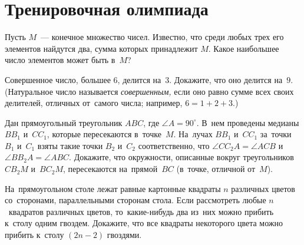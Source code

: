 
\section*{Тренировочная олимпиада}


\begin{problems}

\item
Пусть $M$~— конечное множество чисел.
Известно, что среди любых трех его элементов найдутся два, сумма которых
принадлежит $M$.
Какое наибольшее число элементов может быть в~$M$?

\item
Совершенное число, большее $6$, делится на~$3$.
Докажите, что оно делится на~$9$.
(Натуральное число называется \emph{совершенным,} если оно равно сумме всех
своих делителей, отличных от~самого числа; например, $6 = 1 + 2 + 3$.)

\item
Дан прямоугольный треугольник $ABC$, где $\angle{A} = 90^{\circ}$.
В~нем проведены медианы $B B_1$ и~$C C_1$, которые пересекаются в~точке~$M$.
На~лучах $B B_1$ и~$C C_1$ за~точки $B_1$ и~$C_1$ взяты такие точки
$B_2$ и~$C_2$ соответственно, что $\angle{C C_2 A} = \angle{ACB}$
и~$\angle{B B_2 A} = \angle{ABC}$.
Докажите, что окружности, описанные вокруг треугольников $C B_2 M$ и~$B C_2 M$,
пересекаются на~прямой~$BC$ (в~точке, отличной от~$M$).

\item
На~прямоугольном столе лежат равные картонные квадраты $n$ различных цветов
со~сторонами, параллельными сторонам стола.
Если рассмотреть любые $n$~квадратов различных цветов, то~какие-нибудь два
из~них можно прибить к~столу одним гвоздем.
Докажите, что все квадраты некоторого цвета можно прибить к~столу
$(2 n - 2)$ гвоздями.

\end{problems}

